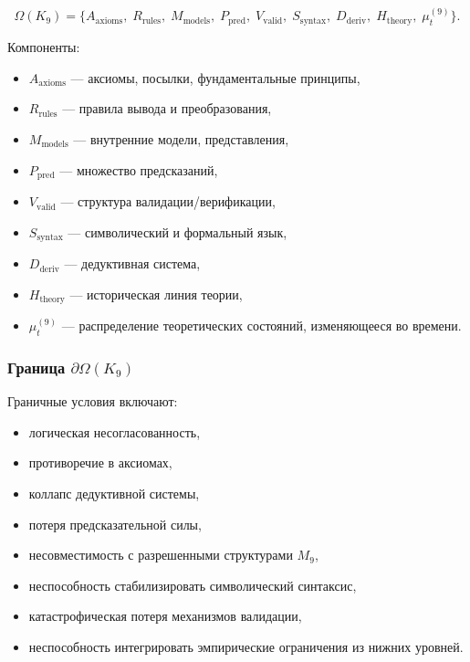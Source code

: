 \[
\Omega(K_9)=
\{
A_{\mathrm{axioms}},\;
R_{\mathrm{rules}},\;
M_{\mathrm{models}},\;
P_{\mathrm{pred}},\;
V_{\mathrm{valid}},\;
S_{\mathrm{syntax}},\;
D_{\mathrm{deriv}},\;
H_{\mathrm{theory}},\;
\mu^{(9)}_t
\}.
\]

Компоненты:
\begin{itemize}
    \item $A_{\mathrm{axioms}}$ — аксиомы, посылки, фундаментальные принципы,
    \item $R_{\mathrm{rules}}$ — правила вывода и преобразования,
    \item $M_{\mathrm{models}}$ — внутренние модели, представления,
    \item $P_{\mathrm{pred}}$ — множество предсказаний,
    \item $V_{\mathrm{valid}}$ — структура валидации/верификации,
    \item $S_{\mathrm{syntax}}$ — символический и формальный язык,
    \item $D_{\mathrm{deriv}}$ — дедуктивная система,
    \item $H_{\mathrm{theory}}$ — историческая линия теории,
    \item $\mu^{(9)}_t$ — распределение теоретических состояний, изменяющееся во времени.
\end{itemize}

\subsubsection{Граница \texorpdfstring{$\partial\Omega(K_9)$}{\partial\Omega(K_9)}}

Граничные условия включают:
\begin{itemize}
    \item логическая несогласованность,
    \item противоречие в аксиомах,
    \item коллапс дедуктивной системы,
    \item потеря предсказательной силы,
    \item несовместимость с разрешенными структурами $M_9$,
    \item неспособность стабилизировать символический синтаксис,
    \item катастрофическая потеря механизмов валидации,
    \item неспособность интегрировать эмпирические ограничения из нижних уровней.
\end{itemize}

